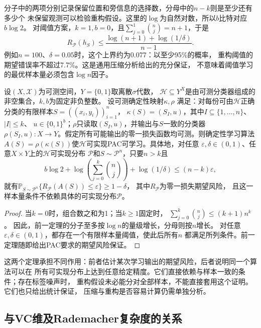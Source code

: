 分子中的两项分别记录保留位置和旁信息的选择数，分母中的$n-k$则是至少还有多少个
未保留观测可以检验重构假设。这里的$\log$为自然对数，所以$b$比特对应$b\log2$。
对阈值方案，$k=1,b=0$，且$\sum_{j=0}^1\binom nj=n+1$，于是
\[
 R_{\mathcal P}(h_S)\leq\frac{\log(n+1)+\log(1/\delta)}{n-1}.
\]
例如$n=100$、$\delta=0.05$时，这个上界约为0.077：以至少95\%的概率，
重构阈值的期望错误率不超过7.7\%。这是通用压缩分析给出的充分保证，
不意味着阈值学习的最优样本量必须包含$\log n$因子。

\begin{theorem}[有界样本压缩推出PAC可学习]
\label{thm:compression-pac-learning}
设$(X,\mathcal X)$为可测空间，$Y=\{0,1\}$取离散$\sigma$代数，
$\mathcal H\subseteq Y^X$是由可测分类器组成的非空集合，$k,b$为固定非负整数。
设可测确定性映射$\kappa,\rho$
满足：对每份可由$\mathcal H$正确分类的有限样本$S=((x_i,y_i))_{i=1}^n$，
$\kappa(S)=(S_I,u)$，其中$I\subseteq\{1,\ldots,n\}$、$|I|\leq k$、
$u\in\{0,1\}^b$；$\rho$只读取$(S_I,u)$，并输出与$S$一致的分类器
$\rho(S_I,u):X\to Y$。假定所有可能输出的零一损失函数均可测。则确定性学习算法
$A(S)=\rho(\kappa(S))$使$\mathcal H$可实现PAC可学习。具体地，对任意
$\varepsilon,\delta\in(0,1)$、任意$X\times Y$上的$\mathcal H$可实现分布
$\mathcal P$和$S\sim\mathcal P^n$，只要$n>k$且
\[
 b\log2+\log\!\left(\sum_{j=0}^k\binom nj\right)+\log(1/\delta)
 \leq(n-k)\varepsilon,
\]
就有$\mathbb P_{S\sim\mathcal P^n}\{R_{\mathcal P}(A(S))\leq\varepsilon\}\geq1-\delta$，
其中$R_{\mathcal P}$为零一损失期望风险，
且这一样本量条件不依赖具体的可实现分布$\mathcal P$。
\end{theorem}

\begin{proof}
当$k=0$时，组合数之和为1；当$k\geq1$固定时，
$\sum_{j=0}^k\binom nj\leq(k+1)n^k$。
因此，前一定理的分子至多按$\log n$的量级增长，分母则按$n$增长。
对任意$\varepsilon,\delta\in(0,1)$，都存在一个有限样本量阈值，使此后所有$n$
都满足所列条件。前一定理随即给出PAC要求的期望风险保证。
\end{proof}

这两个定理承担不同作用：前者估计某次学习输出的期望风险，后者说明同一个算法可以在
所有可实现分布上达到任意给定精度。它们直接依赖与样本一致的条件；存在标签噪声时，
重构假设未必能分对全部样本，不能直接套用这个证明。它们也只给出统计保证，
压缩与重构是否容易计算仍需单独分析。

\subsection{与VC维及Rademacher复杂度的关系}

